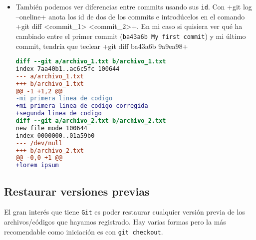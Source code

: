\documentclass[a5paper,10pt]{article}
\begin{document}
\begin{enumerate}
\begin{itemize}
      \item También podemos ver diferencias entre commits usando sus \verb+id+. Con \cverb+git log --oneline+ anota los id de dos de los commits e introdúcelos en el comando \cverb+git diff <commit_1> <commit_2>+. En mi caso si quisiera ver qué ha cambiado entre el primer commit (\verb+ba43a6b My first commit+) y mi último commit, tendría que teclear \cverb+git diff ba43a6b 9a9ea98+
      
      \begin{lstlisting}[language=diff]
diff --git a/archivo_1.txt b/archivo_1.txt
index 7aa40b1..ac6c5fc 100644
--- a/archivo_1.txt
+++ b/archivo_1.txt
@@ -1 +1,2 @@
-mi primera linea de codigo
+mi primera linea de codigo corregida
+segunda linea de codigo
diff --git a/archivo_2.txt b/archivo_2.txt
new file mode 100644
index 0000000..01a59b0
--- /dev/null
+++ b/archivo_2.txt
@@ -0,0 +1 @@
+lorem ipsum

      \end{lstlisting}
      
    \end{itemize}
    \end{enumerate}
  \subsection{Restaurar versiones previas}
    El gran interés que tiene \verb+Git+ es poder restaurar cualquier versión previa de los archivos/códigos que hayamos registrado. Hay varias formas pero la más recomendable como iniciación es con \verb+git checkout+.
    
\end{document}
